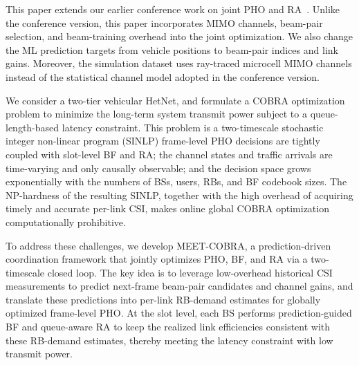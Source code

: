 \documentclass[10pt,journal,letterpaper]{journal_template/IEEEtran}
\newcommand{\rev}[1]{\textcolor{revisioncolor}{{}#1}}
\newif\ifshowdeletions
\newcommand{\currentdel}[1]{\ifshowdeletions\textcolor{deletioncolor}{\sout{#1}}\fi}
\theoremstyle{remark}
\begin{document}


\rev{This paper extends our earlier conference work on joint PHO and RA~\cite{AEPHORA2025ICC}.
Unlike the conference version, this paper incorporates MIMO channels, beam-pair selection, and beam-training overhead into the joint optimization.
We also change the ML prediction targets from vehicle positions to beam-pair indices and link gains.
Moreover, the simulation dataset uses ray-traced microcell MIMO channels instead of the statistical channel model adopted in the conference version.}

We consider a two-tier vehicular HetNet, and formulate a COBRA optimization problem to minimize the long-term system transmit power subject to a queue-length-based latency constraint. 
This problem is a two-timescale stochastic integer non-linear program (SINLP)\currentdel{: the} frame-level PHO decisions are tightly coupled with slot-level BF and RA; the channel states and traffic arrivals are time-varying and only causally observable; and the decision space grows exponentially with the numbers of BSs, users, RBs, and BF codebook sizes. 
The NP-hardness of the resulting SINLP, together with the high overhead of acquiring timely and accurate per-link CSI, makes online global COBRA optimization computationally prohibitive.

To address these challenges, we develop MEET-COBRA, a prediction-driven coordination framework that jointly optimizes PHO, BF, and RA via a two-timescale closed loop. 
The key idea is to leverage low-overhead historical CSI measurements to predict next-frame beam-pair candidates and channel gains, and translate these predictions into per-link RB-demand estimates for globally optimized frame-level PHO. At the slot level, each BS performs prediction-guided BF and queue-aware RA to keep the realized link efficiencies consistent with these RB-demand estimates, thereby meeting the latency constraint with low transmit power.
\end{document}
